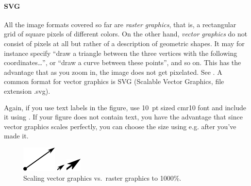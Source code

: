 {
\paragraph{SVG} All the image formats covered so far are \emph{raster graphics}, that is, a rectangular grid of square pixels of different colors. On the other hand, \emph{vector graphics} do not consist of pixels at all but rather of a description of geometric shapes. It may for instance specify ``draw a triangle between the three vertices with the following coordinates\ldots'', or ``draw a curve between these points'', and so on. This has the advantage that as you zoom in, the image does not get pixelated. See . A common format for vector graphics is SVG (Scalable Vector Graphics, file extension .svg).

Again, if you use text labels in the figure, use 10~pt sized cmr10 font and include it using . If your figure does not contain text, you have the advantage that since vector graphics scales perfectly, you can choose the size using e.g.  after you've made it.


\begin{figure}
	\centering
	\begin{minipage}[b]{0.32\linewidth}
		\centering
		\includegraphics[scale=1]{graphics/arrow.pdf}
	\end{minipage}%
	\begin{minipage}[b]{0.32\linewidth}
		\centering
		\includegraphics[scale=10]{graphics/arrowCut.pdf}	
	\end{minipage}%
	\begin{minipage}[b]{0.32\linewidth}
		\centering
		\includegraphics[scale=10]{graphics/arrowCut.png}	
	\end{minipage}%
	\caption{Scaling vector graphics vs.\ raster graphics to 1000\%.}
	\label{fig:latex:arrow}	
\end{figure}

}
